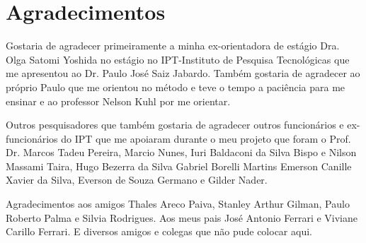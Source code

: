 \documentclass[11pt,twoside,a4paper]{book}
\begin{document}
\chapter*{Agradecimentos}


 Gostaria de agradecer primeiramente a minha ex-orientadora de estágio Dra. Olga Satomi Yoshida  no estágio no IPT-Instituto de Pesquisa Tecnológicas que me apresentou ao Dr. Paulo José Saiz Jabardo. Também gostaria de agradecer ao próprio  Paulo que me orientou no método e teve o tempo a paciência para me ensinar e ao professor Nelson Kuhl por me orientar. 
 
 Outros pesquisadores que também gostaria de agradecer outros funcionários e ex-funcionários do IPT que me apoiaram durante o meu projeto que foram o Prof. Dr. Marcos Tadeu Pereira, Marcio Nunes, Iuri Baldaconi da Silva Bispo e Nilson Massami Taira, Hugo Bezerra da Silva Gabriel Borelli Martins Emerson Canille Xavier da Silva, Everson de Souza Germano e Gilder Nader.
 
 Agradecimentos aos amigos Thales Areco Paiva, Stanley Arthur Gilman, Paulo Roberto Palma e Silvia Rodrigues. Aos meus pais José Antonio Ferrari e Viviane Carillo Ferrari. E diversos amigos e colegas que não pude colocar aqui.

%



\end{document}
